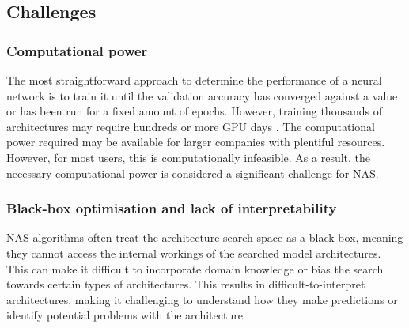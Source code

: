\subsection{Challenges}
\subsubsection{Computational power}
The most straightforward approach to determine the performance of a neural network is to train it until the validation accuracy has converged against a value or has been run for a fixed amount of epochs. However, training thousands of architectures may require hundreds or more \gls{GPU} days \autocite{ren2021comprehensive}. The computational power required may be available for larger companies with plentiful resources. However, for most users, this is computationally infeasible. As a result, the necessary computational power is considered a significant challenge for \gls{NAS}. 

\subsubsection{Black-box optimisation and lack of interpretability}
\gls{NAS} algorithms often treat the architecture search space as a black box, meaning they cannot access the internal workings of the searched model architectures. This can make it difficult to incorporate domain knowledge or bias the search towards certain types of architectures. This results in difficult-to-interpret architectures, making it challenging to understand how they make predictions or identify potential problems with the architecture \autocite{https://doi.org/10.48550/arxiv.1806.09055}.
